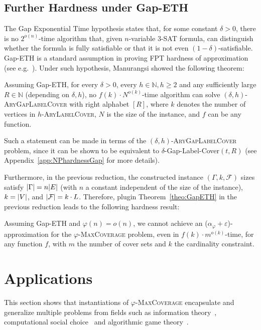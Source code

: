 \subsection{Further Hardness under Gap-ETH}
  \label{section:GapETH}
  The Gap Exponential Time hypothesis states that, for some constant $\delta > 0$, there is no $2^{o(n)}$-time algorithm that, given $n$-variable $3$-SAT formula, can distinguish whether the formula is fully satisfiable or that it is not even $(1-\delta)$-satisfiable. Gap-ETH is a standard assumption in proving FPT hardness of approximation (see e.g.~\cite{CCKLMNT17}). Under such hypothesis, Manurangsi showed the following theorem:

  \begin{theorem}
    \label{theo:GapETH}
    Assuming Gap-ETH, for every $\delta > 0$, every $h \in \mathbb{N}, h \geq 2$ and any sufficiently large $R \in \mathbb{N}$ (depending on $\delta, h$), no $f(k) \cdot N^{o(k)}$-time algorithm can solve $(\delta,h)$-\textsc{AryGapLabelCover} with right alphabet $[R]$, where $k$ denotes the number of vertices in $h$-\textsc{AryLabelCover}, $N$ is the size of the instance, and $f$ can be any function.
  \end{theorem}

  Such a statement can be made in terms of the $(\delta,h)$-\textsc{AryGapLabelCover} problem, since it can be shown to be equivalent to $\delta$-Gap-Label-Cover$(t,R)$ (see Appendix~\ref{app:NPhardnessGap} for more details).

  Furthermore, in the previous reduction, the constructed instance $(\Gamma,k,\mathcal{F})$ sizes satisfy $\abs{\Gamma} = n\abs{E}$ (with $n$ a constant independent of the size of the instance), $k=\abs{V}$, and $\abs{\mathcal{F}} = k \cdot L$. Therefore, plugin Theorem~\ref{theo:GapETH} in the previous reduction leads to the following hardness result:

  \begin{theorem}
    \label{theo:GapHardness}
    Assuming Gap-ETH and $\varphi(n) = o(n)$, we cannot achieve an ($\alpha_{\varphi} + \varepsilon$)-approximation for the $\varphi$-\textsc{MaxCoverage} problem, even in $f(k) \cdot m^{o(k)}$-time, for any function $f$, with $m$ the number of cover sets and $k$ the cardinality constraint.
  \end{theorem}
  
\section{Applications}
\label{section:applications}
This section shows that instantiations of $\varphi$-\textsc{MaxCoverage} encapsulate and generalize multiple problems from fields such as information theory~\cite{CT01}, computational social choice~\cite{BCE16} and algorithmic game theory~\cite{NRTV07}.


